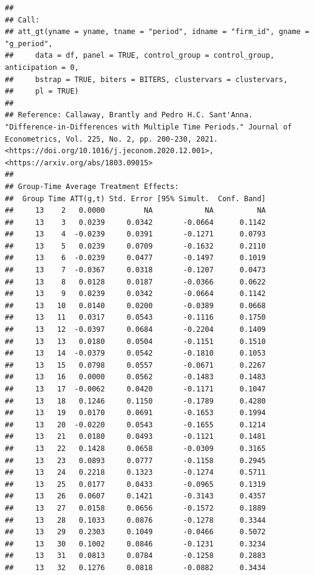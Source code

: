\documentclass[
]{article}
\begin{document}
\begin{verbatim}
## 
## Call:
## att_gt(yname = yname, tname = "period", idname = "firm_id", gname = "g_period", 
##     data = df, panel = TRUE, control_group = control_group, anticipation = 0, 
##     bstrap = TRUE, biters = BITERS, clustervars = clustervars, 
##     pl = TRUE)
## 
## Reference: Callaway, Brantly and Pedro H.C. Sant'Anna.  "Difference-in-Differences with Multiple Time Periods." Journal of Econometrics, Vol. 225, No. 2, pp. 200-230, 2021. <https://doi.org/10.1016/j.jeconom.2020.12.001>, <https://arxiv.org/abs/1803.09015> 
## 
## Group-Time Average Treatment Effects:
##  Group Time ATT(g,t) Std. Error [95% Simult.  Conf. Band]  
##     13    2   0.0000         NA            NA          NA  
##     13    3   0.0239     0.0342       -0.0664      0.1142  
##     13    4  -0.0239     0.0391       -0.1271      0.0793  
##     13    5   0.0239     0.0709       -0.1632      0.2110  
##     13    6  -0.0239     0.0477       -0.1497      0.1019  
##     13    7  -0.0367     0.0318       -0.1207      0.0473  
##     13    8   0.0128     0.0187       -0.0366      0.0622  
##     13    9   0.0239     0.0342       -0.0664      0.1142  
##     13   10   0.0140     0.0200       -0.0389      0.0668  
##     13   11   0.0317     0.0543       -0.1116      0.1750  
##     13   12  -0.0397     0.0684       -0.2204      0.1409  
##     13   13   0.0180     0.0504       -0.1151      0.1510  
##     13   14  -0.0379     0.0542       -0.1810      0.1053  
##     13   15   0.0798     0.0557       -0.0671      0.2267  
##     13   16   0.0000     0.0562       -0.1483      0.1483  
##     13   17  -0.0062     0.0420       -0.1171      0.1047  
##     13   18   0.1246     0.1150       -0.1789      0.4280  
##     13   19   0.0170     0.0691       -0.1653      0.1994  
##     13   20  -0.0220     0.0543       -0.1655      0.1214  
##     13   21   0.0180     0.0493       -0.1121      0.1481  
##     13   22   0.1428     0.0658       -0.0309      0.3165  
##     13   23   0.0893     0.0777       -0.1158      0.2945  
##     13   24   0.2218     0.1323       -0.1274      0.5711  
##     13   25   0.0177     0.0433       -0.0965      0.1319  
##     13   26   0.0607     0.1421       -0.3143      0.4357  
##     13   27   0.0158     0.0656       -0.1572      0.1889  
##     13   28   0.1033     0.0876       -0.1278      0.3344  
##     13   29   0.2303     0.1049       -0.0466      0.5072  
##     13   30   0.1002     0.0846       -0.1231      0.3234  
##     13   31   0.0813     0.0784       -0.1258      0.2883  
##     13   32   0.1276     0.0818       -0.0882      0.3434  

\end{verbatim}
\end{document}
